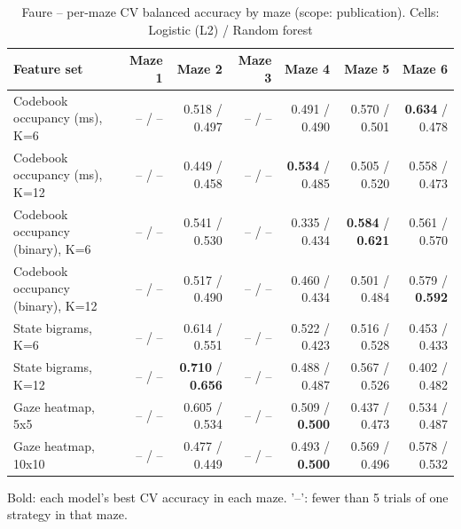 \begin{table}[t]
\centering
\caption{Faure -- per-maze CV balanced accuracy by maze (scope: publication). Cells: Logistic (L2) / Random forest}
\label{tab:permaze_by_maze_Faure}
\begin{tabular}{lrrrrrr}
\toprule
Feature set & Maze 1 & Maze 2 & Maze 3 & Maze 4 & Maze 5 & Maze 6 \\
\midrule
Codebook occupancy (ms), K=6 & -- / -- & 0.518 / 0.497 & -- / -- & 0.491 / 0.490 & 0.570 / 0.501 & \textbf{0.634} / 0.478 \\
Codebook occupancy (ms), K=12 & -- / -- & 0.449 / 0.458 & -- / -- & \textbf{0.534} / 0.485 & 0.505 / 0.520 & 0.558 / 0.473 \\
Codebook occupancy (binary), K=6 & -- / -- & 0.541 / 0.530 & -- / -- & 0.335 / 0.434 & \textbf{0.584} / \textbf{0.621} & 0.561 / 0.570 \\
Codebook occupancy (binary), K=12 & -- / -- & 0.517 / 0.490 & -- / -- & 0.460 / 0.434 & 0.501 / 0.484 & 0.579 / \textbf{0.592} \\
State bigrams, K=6 & -- / -- & 0.614 / 0.551 & -- / -- & 0.522 / 0.423 & 0.516 / 0.528 & 0.453 / 0.433 \\
State bigrams, K=12 & -- / -- & \textbf{0.710} / \textbf{0.656} & -- / -- & 0.488 / 0.487 & 0.567 / 0.526 & 0.402 / 0.482 \\
Gaze heatmap, 5x5 & -- / -- & 0.605 / 0.534 & -- / -- & 0.509 / \textbf{0.500} & 0.437 / 0.473 & 0.534 / 0.487 \\
Gaze heatmap, 10x10 & -- / -- & 0.477 / 0.449 & -- / -- & 0.493 / \textbf{0.500} & 0.569 / 0.496 & 0.578 / 0.532 \\
\bottomrule
\end{tabular}
\par\smallskip
{\footnotesize Bold: each model's best CV accuracy in each maze. '--': fewer than 5 trials of one strategy in that maze.}
\end{table}
